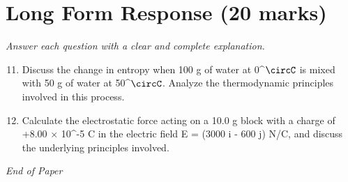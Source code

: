 \documentclass[12pt]{article}
\begin{document}
\section*{Long Form Response (20 marks)}
\textit{Answer each question with a clear and complete explanation.}
\begin{enumerate}[label=\arabic*.]
\setcounter{enumi}{10}
\item Discuss the change in entropy when 100 g of water at 0^\ensuremath{\circC} is mixed with 50 g of water at 50^\ensuremath{\circC}. Analyze the thermodynamic principles involved in this process.
\item Calculate the electrostatic force acting on a 10.0 g block with a charge of +8.00 \ensuremath{\times} 10^-5 C in the electric field E = (3000 i - 600 j) N/C, and discuss the underlying principles involved.
\end{enumerate}

\vfill
\noindent\textit{End of Paper}
\end{document}
